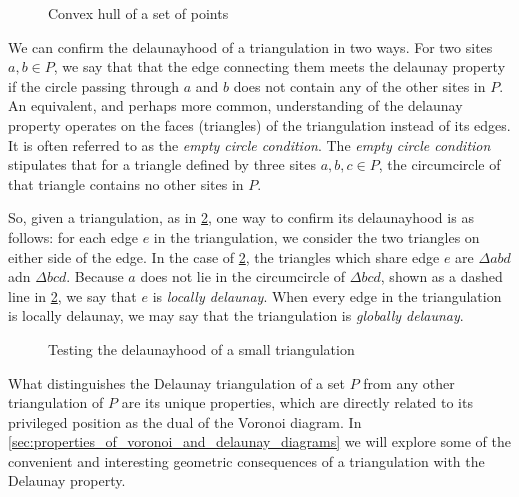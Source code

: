 \documentclass[12pt,twoside]{reedthesis}
\begin{document}
    \begin{figure}[!htb]
      \centering
      
      \caption{Convex hull of a set of points}
      \label{fig:convex_hull}
    \end{figure}

    We can confirm the delaunayhood of a triangulation in two ways. For two sites $a, b \in P$, we say that that the edge connecting them meets the delaunay property if the circle passing through $a$ and $b$ does not contain any of the other sites in $P$. An equivalent, and perhaps more common, understanding of the delaunay property operates on the faces (triangles) of the triangulation instead of its edges. It is often referred to as the \emph{empty circle condition}. The \emph{empty circle condition} stipulates that for a triangle defined by three sites $a, b, c \in P$, the circumcircle of that triangle contains no other sites in $P$.\par

    So, given a triangulation, as in \cref{fig:delaunayhood_small}, one way to confirm its delaunayhood is as follows: for each edge $e$ in the triangulation, we consider the two triangles on either side of the edge.  In the case of \cref{fig:delaunayhood_small}, the triangles which share edge $e$ are $\Delta abd$ adn $\Delta bcd$. Because $a$ does not lie in the circumcircle of $\Delta bcd$, shown as a dashed line in \cref{fig:delaunayhood_small}, we say that $e$ is \emph{locally delaunay}. When every edge in the triangulation is locally delaunay, we may say that the triangulation is \emph{globally delaunay}.

    \begin{figure}[!htb]
      \centering
      
      \caption{Testing the delaunayhood of a small triangulation}
      \label{fig:delaunayhood_small}
    \end{figure}

    What distinguishes the Delaunay triangulation of a set $P$ from any other triangulation of $P$ are its unique properties, which are directly related to its privileged position as the dual of the Voronoi diagram. In \cref{sec:properties_of_voronoi_and_delaunay_diagrams} we will explore some of the convenient and interesting geometric consequences of a triangulation with the Delaunay property.\par

\end{document}
